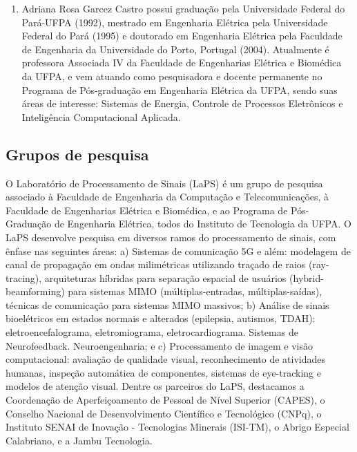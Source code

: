 \begin{enumerate}
\item Adriana Rosa Garcez Castro possui graduação pela Universidade Federal do Pará-UFPA (1992), mestrado em Engenharia Elétrica pela Universidade Federal do Pará (1995) e doutorado em Engenharia Elétrica pela Faculdade de Engenharia da Universidade do Porto, Portugal (2004). Atualmente é professora Associada IV da Faculdade de Engenharias Elétrica e Biomédica da UFPA, e vem atuando como pesquisadora e docente permanente no Programa de Pós-graduação em Engenharia Elétrica da UFPA, sendo suas áreas de interesse: Sistemas de Energia, Controle de Processos Eletrônicos e Inteligência Computacional Aplicada.

\end{enumerate}

\subsection{Grupos de pesquisa}
\label{ssec:grppesq}
O Laboratório de Processamento de Sinais (LaPS) é um grupo de pesquisa associado à Faculdade de Engenharia da Computação e Telecomunicações,  à Faculdade de Engenharias Elétrica e Biomédica, e ao Programa de Pós-Graduação de Engenharia Elétrica, todos do Instituto de Tecnologia da UFPA. O LaPS desenvolve pesquisa em diversos ramos do processamento de sinais, com ênfase nas seguintes áreas: a) Sistemas de comunicação 5G e além: modelagem de canal de propagação em ondas milimétricas utilizando traçado de raios (ray-tracing), arquiteturas híbridas para separação espacial de usuários (hybrid-beamforming) para sistemas MIMO (múltiplas-entradas, múltiplas-saídas), técnicas de comunicação para sistemas MIMO massivos; b) Análise de sinais bioelétricos em estados normais e alterados (epilepsia, autismos, TDAH): eletroencefalograma, eletromiograma, eletrocardiograma. Sistemas de Neurofeedback. Neuroengenharia; e c) Processamento de imagem e visão computacional: avaliação de qualidade visual, reconhecimento de atividades humanas, inspeção automática de componentes, sistemas de eye-tracking e modelos de atenção visual. Dentre os parceiros do LaPS, destacamos a Coordenação de Aperfeiçoamento de Pessoal de Nível Superior (CAPES), o Conselho Nacional de Desenvolvimento Científico e Tecnológico (CNPq), o Instituto SENAI de Inovação - Tecnologias Minerais (ISI-TM), o Abrigo Especial Calabriano, e a Jambu Tecnologia.

